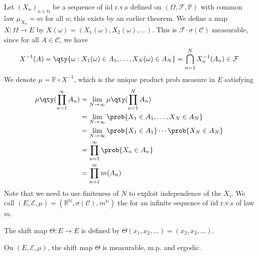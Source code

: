 Let $(X_n)_{n \in \mathbb N}$ be a sequence of iid r.v.s defined on $(\Omega, \mathcal F, \mathbb P)$ with common law $\mu_{X_n} = m$ for all $n$; this exists by an earlier theorem.
We define a map $X \colon \Omega \to E$ by $X(\omega) = (X_1(\omega), X_2(\omega), \dots)$.
This is $\mathcal F$--$\sigma(\mathcal C)$ measurable, since for all $A \in \mathcal C$, we have
\begin{align*}
        X^{-1}(A) = \qty{\omega : X_1(\omega) \in A_1, \dots, X_N(\omega) \in A_N} = \bigcap_{n=1}^N X_n^{-1}(A_n) \in \mathcal F
    \end{align*}
We denote $\mu = \mathbb P \circ X^{-1}$, which is the unique product prob measure in $E$ satisfying
\begin{align*}
		\mu\qty(\prod_{n=1}^\infty A_n) &= \lim_{N \to \infty} \mu\qty(\prod_{n=1}^N A_n) \\
		&= \lim_{N \to \infty} \prob{X_1 \in A_1, \dots, X_N \in A_N} \\
		&= \lim_{N \to \infty} \prob{X_1 \in A_1} \cdots \prob{X_N \in A_N} \\
		&= \prod_{n=1}^\infty \prob{X_n \in A_n} \\
		&= \prod_{n=1}^\infty m(A_n)
\end{align*}
Note that we need to use finiteness of $N$ to exploit independence of the $X_i$.
We call $(E, \mathcal E, \mu) = (\mathbb R^{\mathbb N}, \sigma(\mathcal C), m^{\mathbb N})$ the  for an infinite sequence of iid r.v.s of law $m$.

\begin{definition}
	The shift map $\Theta \colon E \to E$ is defined by $\Theta(x_1, x_2, \dots) = (x_2, x_3, \dots)$.
\end{definition}

\begin{theorem}
	On $(E, \mathcal{E}, \mu)$, the shift map $\Theta$ is measurable, m.p. and ergodic.
\end{theorem}

